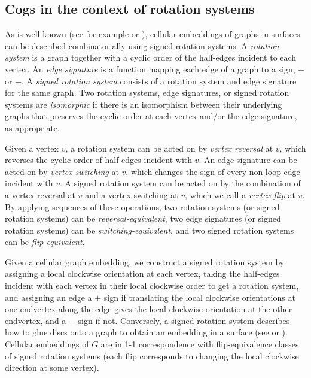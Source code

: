 \documentclass{amsart}
\theoremstyle{definition}
\theoremstyle{remark}
\numberwithin{equation}{section}
\begin{document}
%

\subsection{Cogs in the context of rotation systems}\label{ss:rs}
As is well-known (see for example \cite[Section 3.2]{GT87} or \cite[Section 3.3]{MT01}), cellular embeddings of graphs in surfaces can be described combinatorially using signed rotation systems.
A \emph{rotation system} is a graph together with a cyclic order of the half-edges incident to each vertex.  An \emph{edge signature} is a function mapping each edge of a graph to a sign, $+$ or $-$.  A \emph{signed rotation system} consists of a rotation system and edge signature for the same graph.
Two rotation systems, edge signatures, or signed rotation systems are \emph{isomorphic} if there is an isomorphism between their underlying graphs that preserves the cyclic order at each vertex and/or the edge signature, as appropriate.




Given a vertex $v$, a rotation system can be acted on by \emph{vertex reversal} at $v$, which reverses the cyclic order of half-edges incident with $v$.  An edge signature can be acted on by \emph{vertex switching} at $v$, which changes the sign of every non-loop edge incident with $v$.
A signed rotation system can be acted on by the combination of a vertex reversal at $v$ and a vertex switching at $v$, which we call a \emph{vertex flip} at $v$.
By applying sequences of these operations, two rotation systems (or signed rotation systems) can be \emph{reversal-equivalent}, two edge signatures (or signed rotation systems) can be \emph{switching-equivalent}, and two signed rotation systems can be \emph{flip-equivalent}.


Given a cellular graph embedding, we construct a signed rotation system by assigning a local clockwise orientation at each vertex, taking the half-edges incident with each vertex in their local clockwise order to get a rotation system, and assigning an edge a $+$ sign if translating the local clockwise orientations at one endvertex along the edge gives the local clockwise orientation at the other endvertex, and a $-$ sign if not.
Conversely, a signed rotation system describes how to glue discs onto a graph to obtain an embedding in a surface (see \cite[Section 3.2]{GT87} or \cite[Section 3.3]{MT01}). 
Cellular embeddings of $G$ are in 1-1 correspondence with flip-equivalence classes of signed rotation systems (each flip corresponds to changing the local clockwise direction at some vertex).
\end{document}
